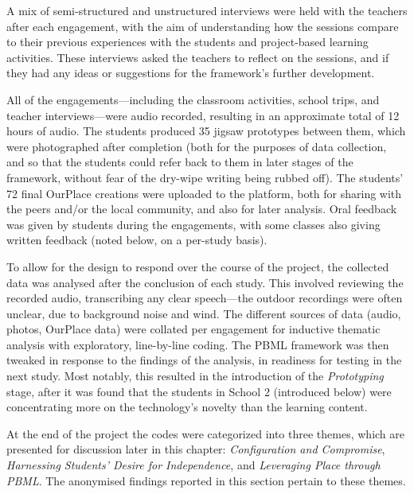 A mix of semi-structured and unstructured interviews were held with the teachers after each engagement, with the aim of understanding how the sessions compare to their previous experiences with the students and project-based learning activities. These interviews asked the teachers to reflect on the sessions, and if they had any ideas or suggestions for the framework's further development.

All of the engagements---including the classroom activities, school trips, and teacher interviews---were audio recorded, resulting in an approximate total of 12 hours of audio. The students produced 35 jigsaw prototypes between them, which were photographed after completion (both for the purposes of data collection, and so that the students could refer back to them in later stages of the framework, without fear of the dry-wipe writing being rubbed off). The students' 72 final OurPlace creations were uploaded to the platform, both for sharing with the peers and/or the local community, and also for later analysis. Oral feedback was given by students during the engagements, with some classes also giving written feedback (noted below, on a per-study basis).

To allow for the design to respond over the course of the project, the collected data was analysed after the conclusion of each study. This involved reviewing the recorded audio, transcribing any clear speech---the outdoor recordings were often unclear, due to background noise and wind. The different sources of data (audio, photos, OurPlace data) were collated per engagement for inductive thematic analysis with exploratory, line-by-line coding. The PBML framework was then tweaked in response to the findings of the analysis, in readiness for testing in the next study. Most notably, this resulted in the introduction of the \textit{Prototyping} stage, after it was found that the students in School 2 (introduced below) were concentrating more on the technology's novelty than the learning content.

At the end of the project the codes were categorized into three themes, which are presented for discussion later in this chapter: \textit{Configuration and Compromise}, \textit{Harnessing Students' Desire for Independence}, and \textit{Leveraging Place through PBML}. The anonymised findings reported in this section pertain to these themes.

